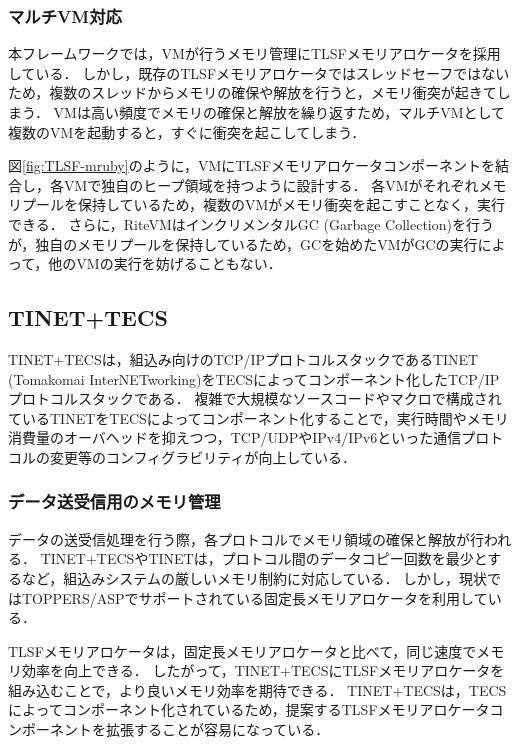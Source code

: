 \documentclass[submit]{ipsj_v2/UTF8/ipsj}
\begin{document}

\subsubsection{マルチVM対応}

本フレームワークでは，VMが行うメモリ管理にTLSFメモリアロケータを採用している．
しかし，既存のTLSFメモリアロケータではスレッドセーフではないため，複数のスレッドからメモリの確保や解放を行うと，メモリ衝突が起きてしまう．
VMは高い頻度でメモリの確保と解放を繰り返すため，マルチVMとして複数のVMを起動すると，すぐに衝突を起こしてしまう．

図\ref{fig:TLSF-mruby}のように，VMにTLSFメモリアロケータコンポーネントを結合し，各VMで独自のヒープ領域を持つように設計する．
各VMがそれぞれメモリプールを保持しているため，複数のVMがメモリ衝突を起こすことなく，実行できる．
さらに，RiteVMはインクリメンタルGC (Garbage Collection)を行うが，独自のメモリプールを保持しているため，GCを始めたVMがGCの実行によって，他のVMの実行を妨げることもない．
    
\subsection{TINET+TECS}
\label{sec:TINET+TECS}

TINET+TECSは，組込み向けのTCP/IPプロトコルスタックであるTINET (Tomakomai InterNETworking)をTECSによってコンポーネント化したTCP/IPプロトコルスタックである．
複雑で大規模なソースコードやマクロで構成されているTINETをTECSによってコンポーネント化することで，実行時間やメモリ消費量のオーバヘッドを抑えつつ，TCP/UDPやIPv4/IPv6といった通信プロトコルの変更等のコンフィグラビリティが向上している．

\subsubsection{データ送受信用のメモリ管理}

データの送受信処理を行う際，各プロトコルでメモリ領域の確保と解放が行われる．
TINET+TECSやTINETは，プロトコル間のデータコピー回数を最少とするなど，組込みシステムの厳しいメモリ制約に対応している．
しかし，現状ではTOPPERS/ASPでサポートされている固定長メモリアロケータを利用している．

TLSFメモリアロケータは，固定長メモリアロケータと比べて，同じ速度でメモリ効率を向上できる．
したがって，TINET+TECSにTLSFメモリアロケータを組み込むことで，より良いメモリ効率を期待できる．
TINET+TECSは，TECSによってコンポーネント化されているため，提案するTLSFメモリアロケータコンポーネントを拡張することが容易になっている．
\end{document}
